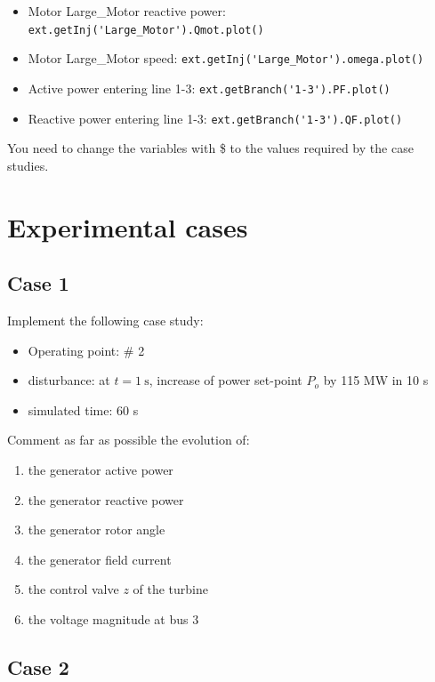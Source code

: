 \documentclass[a4paper,11pt,oneside,onecolumn]{article}
\newcommand\textcode{\Verb}
\begin{document}
\begin{itemize}
	\item Motor Large\_Motor reactive power: 	
	\textcode|ext.getInj('Large_Motor').Qmot.plot()|
	
	\item Motor Large\_Motor speed: 	
	\textcode|ext.getInj('Large_Motor').omega.plot()|
	
	\item Active power entering line 1-3: 	
	\textcode|ext.getBranch('1-3').PF.plot()|
	
	\item Reactive power entering line 1-3: 	
	\textcode|ext.getBranch('1-3').QF.plot()|
	
	
\end{itemize}

\noindent You need to change the variables with \$ to the values required by the case studies.

\section{Experimental cases}

\subsection{Case 1}

Implement the following case study:
\begin{itemize}
\item  Operating point: \# 2
\item  disturbance: at $t=1 \mathrm{~s}$, increase of power set-point $P_o$ by 115 MW in 10 s
\item  simulated time: 60 s
\end{itemize}

\noindent Comment as far as possible the evolution of:
\begin{enumerate}
\item  the generator active power
\item   the generator reactive power
\item   the generator rotor angle
\item   the generator field current
\item   the control valve $z$ of the turbine
\item   the voltage magnitude at bus 3
\end{enumerate}

\subsection{Case 2}
\end{document}
